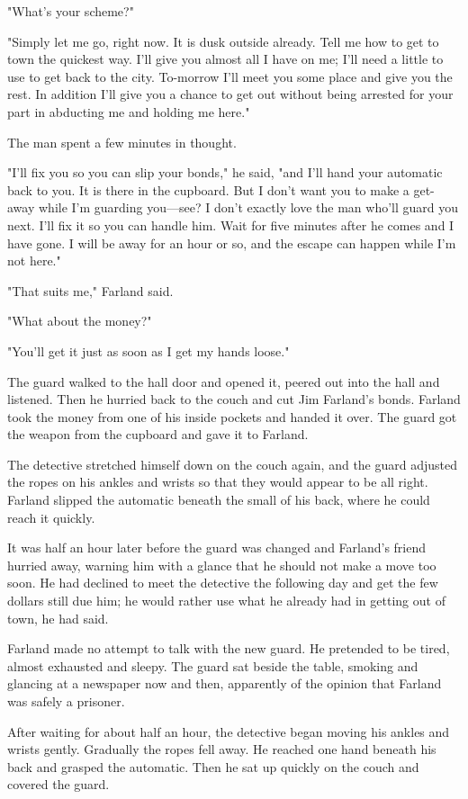 \documentclass{novel}
\begin{document}
"What's your scheme?"

"Simply let me go, right now. It is dusk outside already. Tell me how to get to town the quickest way. I'll give you almost all I have on me; I'll need a little to use to get back to the city. To-morrow I'll meet you some place and give you the rest. In addition I'll give you a chance to get out without being arrested for your part in abducting me and holding me here."

The man spent a few minutes in thought.

"I'll fix you so you can slip your bonds," he said, "and I'll hand your automatic back to you. It is there in the cupboard. But I don't want you to make a get-away while I'm guarding you---see? I don't exactly love the man who'll guard you next. I'll fix it so you can handle him. Wait for five minutes after he comes and I have gone. I will be away for an hour or so, and the escape can happen while I'm not here."

"That suits me," Farland said.

"What about the money?"

"You'll get it just as soon as I get my hands loose."

The guard walked to the hall door and opened it, peered out into the hall and listened. Then he hurried back to the couch and cut Jim Farland's bonds. Farland took the money from one of his inside pockets and handed it over. The guard got the weapon from the cupboard and gave it to Farland.

The detective stretched himself down on the couch again, and the guard adjusted the ropes on his ankles and wrists so that they would appear to be all right. Farland slipped the automatic beneath the small of his back, where he could reach it quickly.

It was half an hour later before the guard was changed and Farland's friend hurried away, warning him with a glance that he should not make a move too soon. He had declined to meet the detective the following day and get the few dollars still due him; he would rather use what he already had in getting out of town, he had said.

Farland made no attempt to talk with the new guard. He pretended to be tired, almost exhausted and sleepy. The guard sat beside the table, smoking and glancing at a newspaper now and then, apparently of the opinion that Farland was safely a prisoner.

After waiting for about half an hour, the detective began moving his ankles and wrists gently. Gradually the ropes fell away. He reached one hand beneath his back and grasped the automatic. Then he sat up quickly on the couch and covered the guard.
\end{document}
